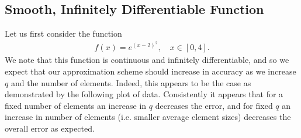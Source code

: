 \documentclass{article}
\begin{document}
\subsection{Smooth, Infinitely Differentiable Function}
Let us first consider the function
  \begin{align*}
    f(x) = e^{\left( x - 2\right)^2}, \quad x\in \left[ 0,4\right].
  \end{align*}
We note that this function is continuous and infinitely differentiable, and so we expect that our approximation scheme should increase in accuracy as we increase $q$ and the number of elements. Indeed, this appears to be the case as demonstrated by the following plot of data. Consistently it appears that for a fixed number of elements an increase in $q$ decreases the error, and for fixed $q$ an increase in number of elements (i.e. smaller average element sizes) decreases the overall error as expected.
\end{document}
